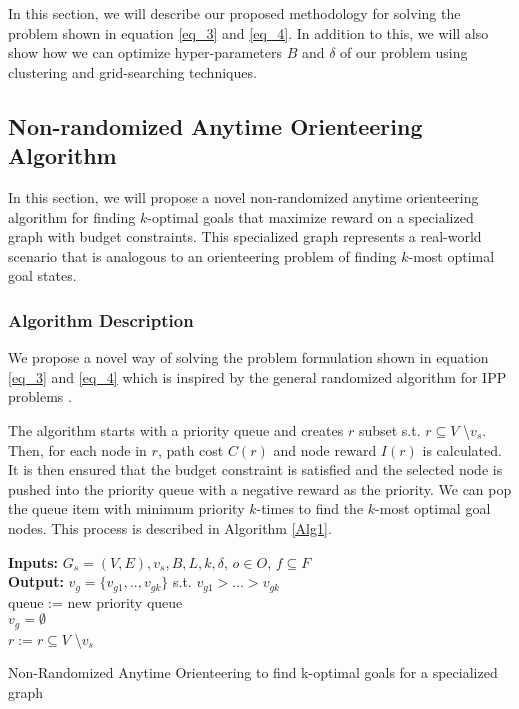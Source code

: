  In this section, we will describe our proposed methodology for solving the problem shown in equation \ref{eq_3} and \ref{eq_4}. In addition to this, we will also show how we can optimize hyper-parameters $B$ and $\delta$ of our problem using clustering and grid-searching techniques. 

\subsection{Non-randomized Anytime Orienteering Algorithm}

In this section, we will propose a novel non-randomized anytime orienteering algorithm for finding $k$-optimal goals that maximize reward on a specialized graph with budget constraints. This specialized graph represents a real-world scenario that is analogous to an orienteering problem of finding $k$-most optimal goal states.

\subsubsection{Algorithm Description}
 We propose a novel way of solving the problem formulation shown in equation \ref{eq_3} and \ref{eq_4} which is inspired by the general randomized algorithm for IPP problems \cite{IPPArora}.
 
 The algorithm starts with a priority queue and creates $r$ subset s.t. $r \subseteq V$ \textbackslash\:$v_s$. Then, for each node in $r$, path cost $C(r)$ and node reward $I(r)$ is calculated. It is then ensured that the budget constraint is satisfied and the selected node is pushed into the priority queue with a negative reward as the priority. We can pop the queue item with minimum priority $k$-times to find the $k$-most optimal goal nodes. This process is described in Algorithm \ref{Alg1}.

\begin{algorithm}
\SetAlgoLined
 \textbf{Inputs:} $G_s = (V, E), v_s, B, L, k, \delta$, $o \in O$, $f \subseteq F$ \\
 \textbf{Output:} $v_g = \{v_{g1},..,v_{gk}\}$ s.t. $v_{g1}>...> v_{gk}$ \\
 queue := new priority queue \\
 $v_g = \emptyset$ \\
 $r := r \subseteq V$ \textbackslash\:$v_s$ \\
 \caption{Non-Randomized Anytime Orienteering to find k-optimal goals for a specialized graph}
 \label{Alg1}
\end{algorithm}
\vspace{-4mm}
